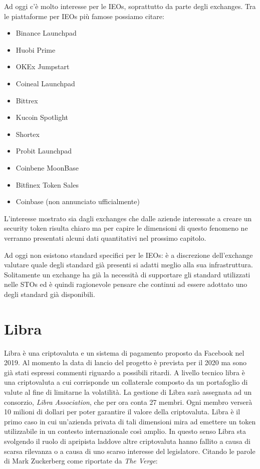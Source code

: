 Ad oggi c'è molto interesse per le IEOs, soprattutto da parte degli exchanges. Tra le piattaforme per IEOs più famose possiamo citare:
\begin{itemize}
    \item Binance Launchpad
    \item Huobi Prime
    \item OKEx Jumpstart
    \item Coineal Launchpad 
    \item Bittrex
    \item Kucoin Spotlight
    \item Shortex 
    \item Probit Launchpad 
    \item Coinbene MoonBase
    \item Bitfinex Token Sales
    \item Coinbase (non annunciato ufficialmente) 
\end{itemize}
L'interesse mostrato sia dagli exchanges che dalle aziende interessate a creare un security token risulta chiaro ma per capire le dimensioni di questo fenomeno ne verranno presentati alcuni dati quantitativi nel prossimo capitolo.

Ad oggi non esistono standard specifici per le IEOs: è a discrezione dell'exchange valutare quale degli standard già presenti si adatti meglio alla sua infrastruttura. Solitamente un exchange ha già la necessità di supportare gli standard utilizzati nelle STOs ed è quindi ragionevole pensare che continui ad essere adottato uno degli standard già disponibili. 

\section{Libra}
Libra è una criptovaluta e un sistema di pagamento proposto da Facebook nel 2019. Al momento la data di lancio del progetto è prevista per il 2020 ma sono già stati espressi commenti riguardo a possibili ritardi. 
A livello tecnico libra è una criptovaluta a cui corrisponde un collaterale composto da un portafoglio di valute al fine di limitarne la volatilità. La gestione di Libra sarà assegnata ad un consorzio, \textit{Libra Association}, che per ora conta 27 membri. Ogni membro verserà 10 milioni di dollari per poter garantire il valore della criptovaluta. 
Libra è il primo caso in cui un'azienda privata di tali dimensioni mira ad emettere un token utilizzabile in un contesto internazionale così amplio. In questo senso Libra sta svolgendo il ruolo di apripista laddove altre criptovaluta hanno fallito a causa di scarsa rilevanza o a causa di uno scarso interesse del legislatore. Citando le parole di Mark Zuckerberg come riportate da \textit{The Verge}: 

